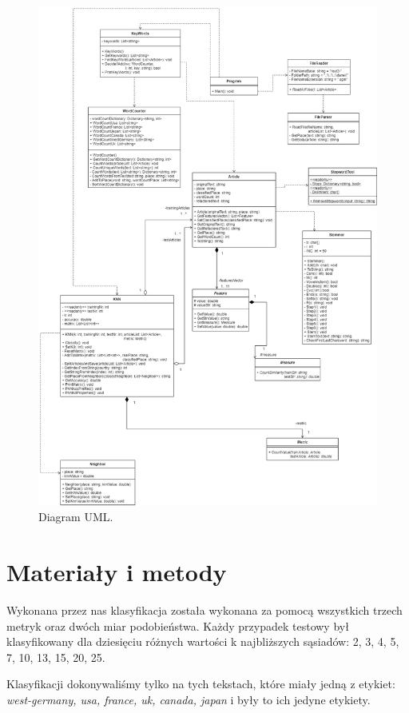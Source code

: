 \documentclass{classrep}
\begin{document}
\newpage
\begin{figure}[h!]
	\centering
	\includegraphics[width=1\textwidth]{uml.png}
	\caption{Diagram UML.}
	\label{uml}
\end{figure}


\newpage
\section{Materiały i metody} %
Wykonana przez nas klasyfikacja została wykonana za pomocą wszystkich trzech metryk oraz dwóch miar podobieństwa. Każdy przypadek testowy był klasyfikowany dla dziesięciu różnych wartości k najbliższych sąsiadów: 2, 3, 4, 5, 7, 10, 13, 15, 20, 25.

Klasyfikacji dokonywaliśmy tylko na tych tekstach, które miały jedną z etykiet: \textsl{west-germany, usa, france, uk, canada, japan} i były to ich jedyne etykiety.
\end{document}
